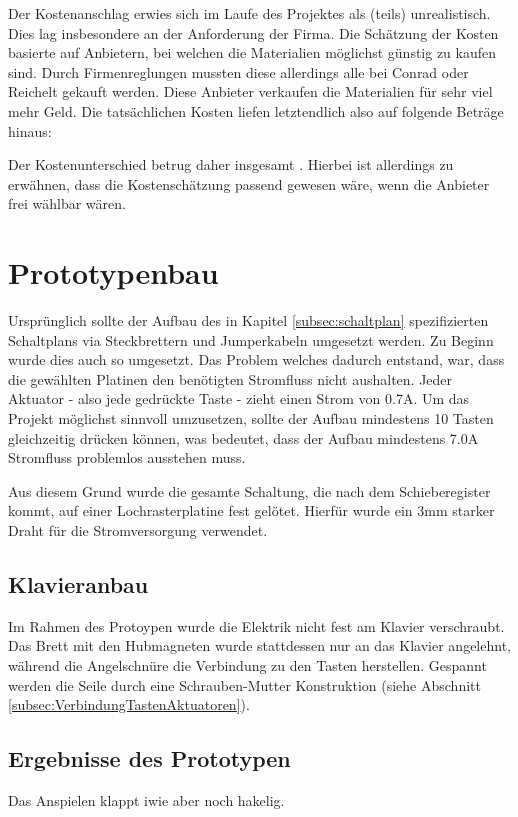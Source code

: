 
Der Kostenanschlag erwies sich im Laufe des Projektes als (teils) unrealistisch. Dies lag insbesondere an der Anforderung
der Firma. Die Schätzung der Kosten basierte auf Anbietern, bei welchen die Materialien möglichst günstig zu kaufen sind.
Durch Firmenreglungen mussten diese allerdings alle bei Conrad oder Reichelt
gekauft werden. Diese Anbieter verkaufen die Materialien für sehr viel mehr Geld. Die tatsächlichen Kosten liefen
letztendlich also auf folgende Beträge hinaus: \newline %

Der Kostenunterschied betrug daher insgesamt .
Hierbei ist allerdings zu erwähnen, dass die Kostenschätzung passend gewesen wäre, wenn die Anbieter frei wählbar wären.

\section{Prototypenbau}
Ursprünglich sollte der Aufbau des in Kapitel \ref{subsec:schaltplan} spezifizierten Schaltplans via Steckbrettern und
Jumperkabeln umgesetzt werden.
Zu Beginn wurde dies auch so umgesetzt. Das Problem welches dadurch entstand, war, dass die gewählten Platinen den
benötigten Stromfluss nicht aushalten.\newline
Jeder Aktuator - also jede gedrückte Taste - zieht einen Strom von 0.7A. Um das Projekt möglichst sinnvoll umzusetzen,
sollte der Aufbau mindestens 10 Tasten gleichzeitig drücken können, was bedeutet, dass der Aufbau mindestens 7.0A
Stromfluss problemlos ausstehen muss.

Aus diesem Grund wurde die gesamte Schaltung, die nach dem Schieberegister kommt, auf einer Lochrasterplatine fest gelötet.
Hierfür wurde ein 3mm starker Draht für die Stromversorgung verwendet.

\subsection{Klavieranbau}
Im Rahmen des Protoypen wurde die Elektrik nicht fest am Klavier verschraubt.
Das Brett mit den Hubmagneten wurde stattdessen nur an das Klavier angelehnt, während die Angelschnüre die Verbindung zu den Tasten herstellen.
Gespannt werden die Seile durch eine Schrauben-Mutter Konstruktion (siehe Abschnitt \ref{subsec:VerbindungTastenAktuatoren}).

\subsection{Ergebnisse des Prototypen}
Das Anspielen klappt iwie aber noch hakelig.


